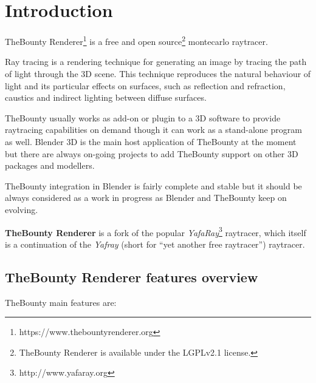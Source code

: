 \chapter*{Introduction}

TheBounty Renderer\footnote{https://www.thebountyrenderer.org} is a free and open source\footnote{TheBounty Renderer is available under the LGPLv2.1 license.} montecarlo raytracer.

\bigskip

Ray tracing is a rendering technique for generating an image by tracing the path of light through the 3D scene. This technique reproduces the natural behaviour of light and its particular effects on surfaces, such as reflection and refraction, caustics and indirect lighting between diffuse surfaces.

TheBounty usually works as add-on or plugin to a 3D software to provide raytracing capabilities on demand though it can work as a stand-alone program as well. Blender 3D is the main host application of TheBounty at the moment but there are always on-going projects to add TheBounty support on other 3D packages and modellers.

TheBounty integration in Blender is fairly complete and stable but it should be always considered as a work in progress as Blender and TheBounty keep on evolving. 

\textbf{TheBounty Renderer} is a fork of the popular \textit{YafaRay}\footnote{http://www.yafaray.org} raytracer, which itself is a continuation of the \textit{Yafray} (short for ``yet another free raytracer'') raytracer.


\section*{TheBounty Renderer features overview}

TheBounty main features are:


